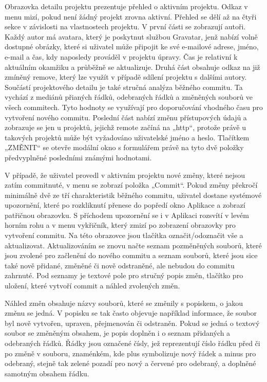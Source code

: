 Obrazovka detailu projektu prezentuje přehled o aktivním projektu. Odkaz v menu mizí, pokud není žádný projekt zrovna aktivní. Přehled se dělí až na čtyři sekce v závislosti na vlastnostech projektu. V první části se zobrazují autoři. Každý autor má avatara, který je poskytnut službou Gravatar, jenž nabízí volně dostupné obrázky, které si uživatel může připojit ke své e-mailové adrese, jméno, e-mail a čas, kdy naposledy prováděl v projektu úpravy. Čas je relativní k aktuálním okamžiku a průběžně se aktualizuje. Druhá část obsahuje odkaz na již zmíněný remove, který lze využít v případě sdílení projektu s dalšími autory. Součástí projektového detailu je také stručná analýza běžného commitu. Ta vychází z mediánů přianých řádků, odebraných řádků a změněných souborů ve všech commitech. Tyto hodnoty se využívají pro doporučování vhodného času pro vytvoření nového commitu. Poslední část nabízí změnu přístupových údajů a zobrazuje se jen u projektů, jejichž remote začíná na „http“, protože právě u takových projektů může být vyžadováno uživatelské jméno a heslo. Tlačítkem „ZMĚNIT“ se otevře modální okno s formulářem právě na tyto dvě položky předvyplněné posledními známými hodnotami.

V případě, že uživatel provedl v aktivním projektu nové změny, které nejsou zatím commitnuté, v menu se zobrazí položka „Commit“. Pokud změny překročí minimálně dvě ze tří charakteristik běžného commitu, uživatel dostane systémové upozornění, které po rozkliknutí přenese do popředí okno Aplikace a zobrazí patřičnou obrazovku. S příchodem upozornění se i v Aplikaci rozsvítí v levém horním rohu a v menu vykřičník, který zmizí po zobrazení obrazovky pro vytvoření commitu. Na této obrazovce jsou tlačítka označit/odoznačit vše a aktualizovat. Aktualizováním se znovu načte seznam pozměněných souborů, které jsou zvolené pro začlenění do nového commitu a seznam souborů, které jsou sice také nově přidané, změněné či nově odstraněné, ale nebudou do commitu zahrnuté. Pod seznamy je textové pole pro stručný popis změn, tlačítko pro uložení, které vytvoří commit a náhled zvolených změn.

Náhled změn obsahuje názvy souborů, které se změnily s popiskem, o jakou změnu se jedná. V popisku se tak často objevuje například informace, že soubor byl nově vytvořen, upraven, přejmenován či odstraněn. Pokud se jedná o textový soubor se změněným obsahem, je popis doplněn i o seznam přidaných a odebraných řádků. Řádky jsou označené čísly, jež reprezentují číslo řádku před či po změně v souboru, znaménkém, kde plus symbolizuje nový řádek a minus pro odebraný, stejně tak zelené pozadí pro nový a červené pro odebraný, a doplněné samotným obsahem řádku.

